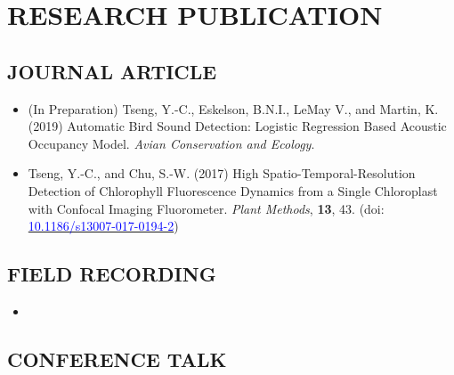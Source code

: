 \documentclass[11pt,letterpaper,sans]{moderncv}        %
\begin{document}
\section{RESEARCH PUBLICATION}
\subsection{JOURNAL ARTICLE}
\begin{itemize}
\item{(In Preparation) Tseng, Y.-C., Eskelson, B.N.I., LeMay V., and Martin, K. (2019) Automatic Bird Sound Detection: Logistic Regression Based Acoustic Occupancy Model. \textit{Avian Conservation and Ecology}.}
\vspace{3pt}

\item{Tseng, Y.-C., and Chu, S.-W. (2017) High Spatio-Temporal-Resolution Detection of Chlorophyll Fluorescence Dynamics from a Single Chloroplast with Confocal Imaging Fluorometer. \textit{Plant Methods}, \textbf{13}, 43. (doi: \href{https://doi.org/10.1186/s13007-017-0194-2}{\textcolor{blue}{10.1186/s13007-017-0194-2}})}
\end{itemize}

\subsection{FIELD RECORDING}
\begin{itemize}
\item{}
\end{itemize}


\subsection{CONFERENCE TALK}
\end{document}
